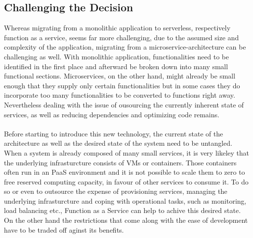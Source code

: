 \documentclass[11pt]{article}
\begin{document}
\subsection{Challenging the Decision}
Whereas migrating from a monolithic application to serverless, respectively function as a service, seems far more challenging, due to the assumed size and complexity of the application, migrating from a microservice-architecture can be challenging as well. With monolithic application, functionalities need to be identified in the first place and afterward be broken down into many small functional sections. Microservices, on the other hand, might already be small enough that they supply only certain functionalities but in some cases they do incorporate too many functionalities to be converted to functions right away. Nevertheless dealing with the issue of ousourcing the currently inherent state of services, as well as reducing dependencies and optimizing code remains. \\\\ %
Before starting to introduce this new technology, the current state of the architecture as well as the desired state of the system need to be untangled. When a system is already composed of many small services, it is very likeley that the underlying infrasturcture consists of VMs or containers. Those containers often run in an PaaS environment and it is not possible to scale them to zero to free reserved computing capacity, in favour of other services to consume it. To do so or even to outsource the expense of provisioning services, managing the underlying infrasturcture and coping with operational tasks, such as monitoring, load balancing etc., Function as a Service can help to achive this desired state. On the other hand the restrictions that come along with the ease of development have to be traded off aginst its benefits. \\\\
\end{document}
